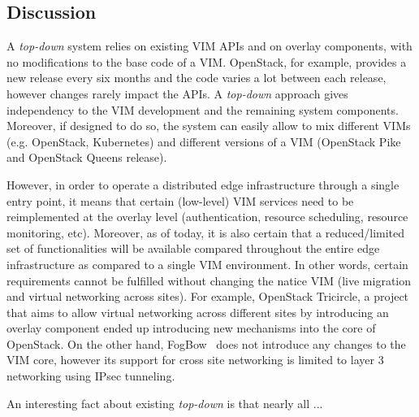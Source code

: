 


\subsection{Discussion}
\label{sec:design_discussion}



A \emph{top-down} system  relies on existing VIM APIs and on overlay components, with no modifications to the base code of a VIM.
OpenStack, for example, provides a new release every six months and the code varies a lot between each release, however changes rarely impact the APIs. A \emph{top-down} approach gives independency to the VIM development and the remaining system components. Moreover, if designed to do so, the system can easily allow to mix different VIMs (e.g. OpenStack, Kubernetes) and different versions of a VIM (\eg OpenStack Pike and OpenStack Queens release). 

However, in order to operate a distributed edge infrastructure through a single entry point, it means that certain (low-level) VIM services need to be reimplemented at the overlay level (\eg authentication, resource scheduling, resource monitoring, etc). 
Moreover, as of today, it is also certain that a reduced/limited set of functionalities will be available compared throughout the entire edge infrastructure as compared to a single VIM environment. In other words, certain requirements cannot be fulfilled without changing the natice VIM (\eg live migration and virtual networking across sites). For example, OpenStack Tricircle, a project that aims to allow virtual networking across different sites by introducing an overlay component ended up introducing new mechanisms into the core of OpenStack. On the other hand, FogBow~\cite{brasileiro2016fogbow} does not introduce any changes to the VIM core, however its support for cross site networking is limited to layer 3 networking using IPsec tunneling.

An interesting fact about existing \emph{top-down} is that nearly all ...

